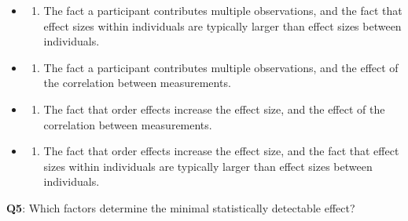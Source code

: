 \documentclass[
  letterpaper,
  DIV=11,
  numbers=noendperiod]{scrreprt}
\providecommand{\tightlist}{%
  \setlength{\itemsep}{0pt}\setlength{\parskip}{0pt}}\usepackage{longtable,booktabs,array}
\begin{document}
\begin{itemize}
\item
  \begin{enumerate}
  \def\labelenumi{(\Alph{enumi})}
  \tightlist
  \item
    The fact a participant contributes multiple observations, and the
    fact that effect sizes within individuals are typically larger than
    effect sizes between individuals.\\
  \end{enumerate}
\item
  \begin{enumerate}
  \def\labelenumi{(\Alph{enumi})}
  \setcounter{enumi}{1}
  \tightlist
  \item
    The fact a participant contributes multiple observations, and the
    effect of the correlation between measurements.\\
  \end{enumerate}
\item
  \begin{enumerate}
  \def\labelenumi{(\Alph{enumi})}
  \setcounter{enumi}{2}
  \tightlist
  \item
    The fact that order effects increase the effect size, and the effect
    of the correlation between measurements.\\
  \end{enumerate}
\item
  \begin{enumerate}
  \def\labelenumi{(\Alph{enumi})}
  \setcounter{enumi}{3}
  \tightlist
  \item
    The fact that order effects increase the effect size, and the fact
    that effect sizes within individuals are typically larger than
    effect sizes between individuals.\\
  \end{enumerate}
\end{itemize}

\textbf{Q5}: Which factors determine the minimal statistically
detectable effect?
\end{document}
